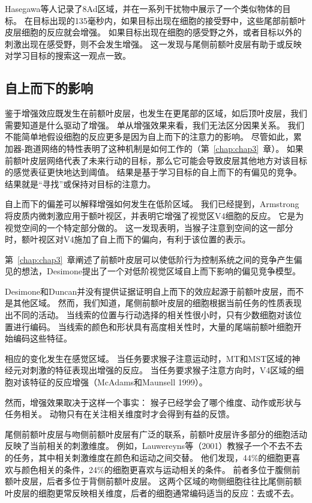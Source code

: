 Hasegawa等人\cite{hasegawa2000search}记录了8Ad区域，并在一系列干扰物中展示了一个类似物体的目标。
在目标出现的135毫秒内，如果目标出现在细胞的接受野中，这些尾部前额叶皮层细胞的反应就会增强。
如果目标出现在细胞的感受野之外，或者目标以外的刺激出现在感受野，则不会发生增强。
这一发现与尾侧前额叶皮层有助于或反映对学习目标的搜索这一观点一致。



\subsection{自上而下的影响}

鉴于增强效应既发生在前额叶皮层，也发生在更尾部的区域，如后顶叶皮层，我们需要知道是什么驱动了增强。
单从增强效果来看，我们无法区分因果关系。
我们不能简单地假设细胞的反应更多是因为自上而下的注意力的影响。
尽管如此，累加器-跑道网络的特性表明了这种机制是如何工作的（第~\ref{chap:chap3}~章）。
如果前额叶皮层网络代表了未来行动的目标，那么它可能会导致皮层其他地方对该目标的感觉表征更快地达到阈值。
结果是基于学习目标的自上而下的有偏见的竞争\cite{desimone1995neural}。
结果就是“寻找”或保持对目标的注意力。


自上而下的偏差可以解释增强如何发生在低阶区域。
我们已经提到，Armstrong\cite{armstrong2007rapid}将皮质内微刺激应用于额叶视区，并表明它增强了视觉区V4细胞的反应。
它是为视觉空间的一个特定部分做的。
这一发现表明，当猴子注意到空间的这一部分时，额叶视区对V4施加了自上而下的偏向，有利于该位置的表示。


第~\ref{chap:chap3}~章阐述了前额叶皮层可以使低阶行为控制系统之间的竞争产生偏见的想法，Desimone\cite{desimone1995neural}提出了一个对低阶视觉区域自上而下影响的偏见竞争模型。


Desimone和Duncan并没有提供证据证明自上而下的效应起源于前额叶皮层，而不是其他区域。
然而，我们知道，尾侧前额叶皮层的细胞根据当前任务的性质表现出不同的活动。
当线索的位置与行动选择的相关性很小时，只有少数细胞对该位置进行编码\cite{chen2001neuronal}。
当线索的颜色和形状具有高度相关性时，大量的尾端前额叶细胞开始编码这些特征\cite{bichot1996visual}。


相应的变化发生在感觉区域。
当任务要求猴子注意运动时，MT和MST区域的神经元对刺激的特征表现出增强的反应\cite{treue1996attentional}。
当任务要求猴子注意方向时，V4区域的细胞对该特征的反应增强（McAdams和Maunsell 1999）。


然而，增强效果取决于这样一个事实：
猴子已经学会了哪个维度、动作或形状与任务相关。
动物只有在关注相关维度时才会得到有益的反馈。


尾侧前额叶皮层与吻侧前额叶皮层有广泛的联系，前额叶皮层许多部分的细胞活动反映了当前相关的刺激维度。
例如，Lauwereyns等（2001）教猴子一个不去不去的任务，其中相关刺激维度在颜色和运动之间交替。
他们发现，44\%的细胞更喜欢与颜色相关的条件，24\%的细胞更喜欢与运动相关的条件。
前者多位于腹侧前额叶皮层，后者多位于背侧前额叶皮层。
这两个区域的吻侧细胞往往比尾侧前额叶皮层的细胞更常反映相关维度，后者的细胞通常编码适当的反应：去或不去。


